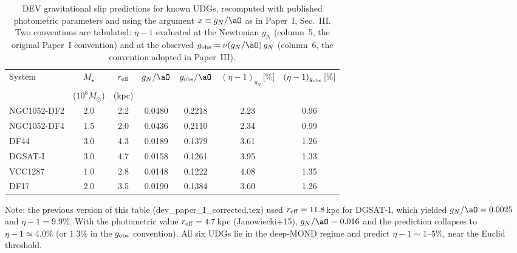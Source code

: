 \begin{table}[h]
\caption{DEV gravitational slip predictions for known UDGs,
recomputed with published photometric parameters and using the
argument $x \equiv g_N/\aO$ as in Paper~I, Sec.~III.
Two conventions are tabulated: $\eta-1$ evaluated at the
Newtonian $g_N$ (column~5, the original Paper~I convention) and
at the observed $g_{\rm obs}=\nu(g_N/\aO)\,g_N$ (column~6,
the convention adopted in Paper~III).}
\label{tab:udg}
\begin{ruledtabular}
\begin{tabular}{lcccccc}
System & $M_\star$ & $r_{\rm eff}$ & $g_N/\aO$ & $g_{\rm obs}/\aO$ & $(\eta-1)_{g_N}$\,[\%] & $(\eta-1)_{g_{\rm obs}}$\,[\%] \\
       & ($10^8 M_\odot$) & (kpc) & & & & \\
\hline
NGC1052-DF2 & 2.0 & 2.2 & 0.0480 & 0.2218 & 2.23 & 0.96 \\
NGC1052-DF4 & 1.5 & 2.0 & 0.0436 & 0.2110 & 2.34 & 0.99 \\
DF44 & 3.0 & 4.3 & 0.0189 & 0.1379 & 3.61 & 1.26 \\
DGSAT-I & 3.0 & 4.7 & 0.0158 & 0.1261 & 3.95 & 1.33 \\
VCC1287 & 1.0 & 2.8 & 0.0148 & 0.1222 & 4.08 & 1.35 \\
DF17 & 2.0 & 3.5 & 0.0190 & 0.1384 & 3.60 & 1.26 \\
\end{tabular}
\end{ruledtabular}
{\small Note: the previous version of this table (dev\_paper\_I\_corrected.tex)
used $r_{\rm eff}=11.8$\,kpc for DGSAT-I, which yielded
$g_N/\aO=0.0025$ and $\eta-1=9.9\%$. With the photometric value
$r_{\rm eff}=4.7$\,kpc (Janowiecki+15), $g_N/\aO=0.016$ and the
prediction collapses to $\eta-1\simeq 4.0\%$ (or $1.3\%$ in the
$g_{\rm obs}$ convention). All six UDGs lie in the deep-MOND regime
and predict $\eta-1\sim 1$--$5\%$, near the Euclid threshold.}
\end{table}